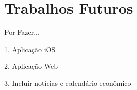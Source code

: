 
\section{Trabalhos Futuros}
Por Fazer...

1. Aplicação iOS

2. Aplicação Web

3. Incluir notícias e calendário econômico




